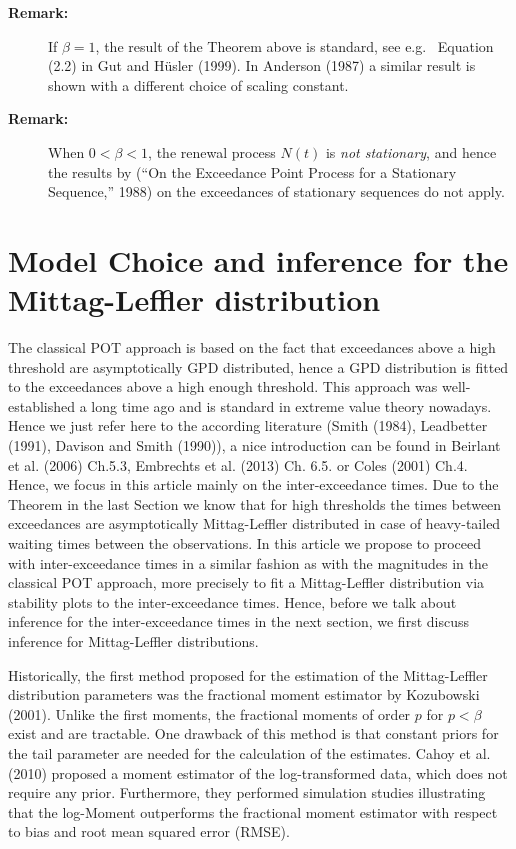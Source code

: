 \documentclass[]{elsarticle} %
\begin{document}
\begin{description}
\item[\textbf{Remark:}]
If \(\beta = 1\), the result of the Theorem above is standard, see e.g.~
Equation (2.2) in Gut and Hüsler (1999). In Anderson (1987) a similar
result is shown with a different choice of scaling constant.
\item[\textbf{Remark:}]
When \(0 < \beta < 1\), the renewal process \(N(t)\) is \emph{not
stationary}, and hence the results by (``On the Exceedance Point Process
for a Stationary Sequence,'' 1988) on the exceedances of stationary
sequences do not apply.
\end{description}

\hypertarget{sec:ML}{%
\section{Model Choice and inference for the Mittag-Leffler
distribution}\label{sec:ML}}

The classical POT approach is based on the fact that exceedances above a
high threshold are asymptotically GPD distributed, hence a GPD
distribution is fitted to the exceedances above a high enough threshold.
This approach was well-established a long time ago and is standard in
extreme value theory nowadays. Hence we just refer here to the according
literature (Smith (1984), Leadbetter (1991), Davison and Smith (1990)),
a nice introduction can be found in Beirlant et al. (2006) Ch.5.3,
Embrechts et al. (2013) Ch. 6.5. or Coles (2001) Ch.4. Hence, we focus
in this article mainly on the inter-exceedance times. Due to the Theorem
in the last Section we know that for high thresholds the times between
exceedances are asymptotically Mittag-Leffler distributed in case of
heavy-tailed waiting times between the observations. In this article we
propose to proceed with inter-exceedance times in a similar fashion as
with the magnitudes in the classical POT approach, more precisely to fit
a Mittag-Leffler distribution via stability plots to the
inter-exceedance times. Hence, before we talk about inference for the
inter-exceedance times in the next section, we first discuss inference
for Mittag-Leffler distributions.

Historically, the first method proposed for the estimation of the
Mittag-Leffler distribution parameters was the fractional moment
estimator by Kozubowski (2001). Unlike the first moments, the fractional
moments of order \(p\) for \(p<\beta\) exist and are tractable. One
drawback of this method is that constant priors for the tail parameter
are needed for the calculation of the estimates. Cahoy et al. (2010)
proposed a moment estimator of the log-transformed data, which does not
require any prior. Furthermore, they performed simulation studies
illustrating that the log-Moment outperforms the fractional moment
estimator with respect to bias and root mean squared error (RMSE).
\end{document}
